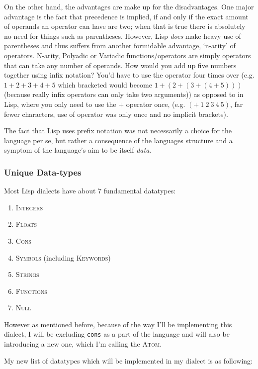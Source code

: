 \documentclass{article}
\newcommand{\code}[1]{\texttt{#1}}
\begin{document}
    On the other hand, the advantages are make up for the disadvantages.
    One major advantage is the fact that precedence is implied, if and only if
    the exact amount of operands an operator can have are two; when that is true
    there is absolutely no need for things such as parentheses. However, Lisp
    \emph{does} make heavy use of parentheses and thus suffers from another
    formidable advantage, `n-arity' of operators. N-arity, Polyadic or Variadic
    functions/operators are simply operators that can take any number of operands.
    How would you add up five numbers together using infix notation?
    You'd have to use the operator four times over (e.g. $1 + 2 + 3 + 4 + 5$
    which bracketed would become $1 + (2 + (3 + (4 + 5)))$ (because really infix
    operators can only take two arguments)) as opposed to in Lisp, where you only
    need to use the $+$ operator once, (e.g. $(+\ 1\ 2\ 3\ 4\ 5)$, far fewer
    characters, use of operator was only once and no implicit brackets).

    The fact that Lisp uses prefix notation was not necessarily a choice for
    the language per se, but rather a consequence of the languages structure and
    a symptom of the language's aim to be itself \emph{data}.

    \subsubsection{Unique Data-types}
      Most Lisp dialects have about 7 fundamental datatypes:
      \begin{enumerate}
        \item \textsc{Integers}
        \item \textsc{Floats}
        \item \textsc{Cons}
        \item \textsc{Symbols} (including \textsc{Keywords})
        \item \textsc{Strings}
        \item \textsc{Functions}
        \item \textsc{Null}
      \end{enumerate}

      However as mentioned before, because of the way I'll be implementing this
      dialect, I will be excluding \code{cons} as a part of the language and will
      also be introducing a new one, which I'm calling the \textsc{Atom}.

      My new list of datatypes which will be implemented in my dialect is as
      following:
\end{document}
